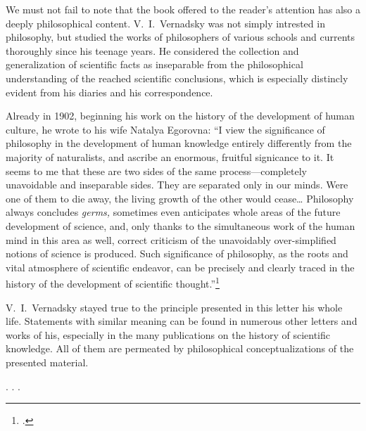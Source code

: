 We must not fail to note that the book offered to the reader's attention has
also a deeply philosophical content.  V.\ I.\ Vernadsky was not simply
intrested in philosophy, but studied the works of philosophers of various
schools and currents thoroughly since his teenage years.  He considered the
collection and generalization of scientific facts as inseparable from the
philosophical understanding of the reached scientific conclusions, which is
especially distincly evident from his diaries and his correspondence.

Already in 1902, beginning his work on the history of the development of human
culture, he wrote to his wife Natalya Egorovna: ``I view the significance of
philosophy in the development of human knowledge entirely differently from the
majority of naturalists, and ascribe an enormous, fruitful signicance to it.
It seems to me that these are two sides of the same process---completely
unavoidable and inseparable sides.  They are separated only in our minds.  Were
one of them to die away, the living growth of the other would cease\dots{}
Philosophy always concludes \emph{germs, }sometimes even anticipates whole
areas of the future development of science, and, only thanks to the
simultaneous work of the human mind in this area as well, correct criticism of
the unavoidably over-simplified notions of science is produced.  Such
significance of philosophy, as the roots and vital atmosphere of scientific
endeavor, can be precisely and clearly traced in the history of the development
of scientific thought.''\footcite{vernadsky1988trudy-p21}

V.\ I.\ Vernadsky stayed true to the principle presented in this letter his
whole life.  Statements with similar meaning can be found in numerous other
letters and works of his, especially in the many publications on the history of
scientific knowledge.  All of them are permeated by philosophical
conceptualizations of the presented material.

. . .
